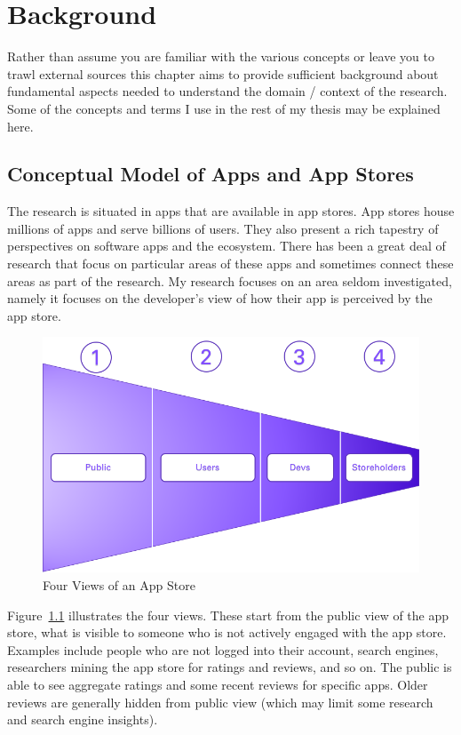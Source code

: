 \chapter{Background}
Rather than assume you are familiar with the various concepts or leave you to trawl external sources this chapter aims to provide sufficient background about fundamental aspects needed to understand the domain / context of the research. Some of the concepts and terms I use in the rest of my thesis may be explained here.

\section{Conceptual Model of Apps and App Stores}
The research is situated in apps that are available in app stores. App stores house millions of apps and serve billions of users. They also present a rich tapestry of perspectives on software apps and the ecosystem. There has been a great deal of research that focus on particular areas of these apps and sometimes connect these areas as part of the research. My research focuses on an area seldom investigated, namely it focuses on the developer's view of how their app is perceived by the app store.

\begin{figure}[ht]
    \centering
    \includegraphics[width=12cm]{images/4-views-of-apps-in-app-store.png}
    \caption{Four Views of an App Store}
    \label{fig:4-views-of-apps-in-app-store}
\end{figure}

Figure~\ref{fig:4-views-of-apps-in-app-store} illustrates the four views. These start from the public view of the app store, what is visible to someone who is not actively engaged with the app store. Examples include people who are not logged into their account, search engines, researchers mining the app store for ratings and reviews, and so on. The public is able to see aggregate ratings and some recent reviews for specific apps. Older reviews are generally hidden from public view (which may limit some research and search engine insights).

